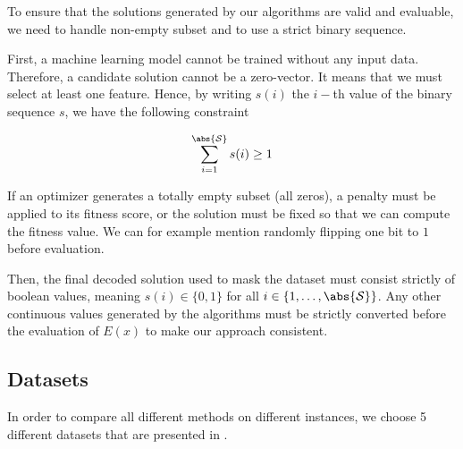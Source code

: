 \documentclass[12pt, openany]{article}
\begin{document}
To ensure that the solutions generated by our algorithms are valid and evaluable, we need to handle non-empty subset and to use a strict binary sequence.

First, a machine learning model cannot be trained without any input data. Therefore, a candidate solution cannot be a zero-vector. It means that we must select at least one feature. Hence, by writing $s(i)$ the $i-$th value of the binary sequence $s$, we have the following constraint

\begin{equation}\label{eq:non_zero_constraint}
    \sum_{i=1}^{\abs{\mathcal{S}}} s(i) \geq 1
\end{equation}

If an optimizer generates a totally empty subset (all zeros), a penalty must be applied to its fitness score, or the solution must be fixed so that we can compute the fitness value. We can for example mention randomly flipping one bit to $1$ before evaluation.
    
Then, the final decoded solution used to mask the dataset must consist strictly of boolean values, meaning $s(i) \in \{0, 1\}$ for all $i \in \{1, \dots, \abs{\mathcal{S}}\}$. Any other continuous values generated by the algorithms must be strictly converted before the evaluation of $E(x)$ to make our approach consistent.

\subsection{Datasets}\label{sec:datasets}

In order to compare all different methods on different instances, we choose 5 different datasets that are presented in .
\end{document}
